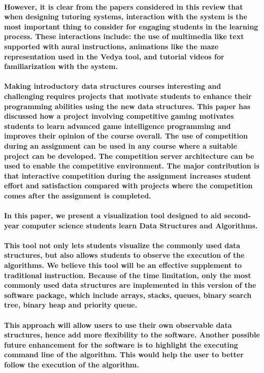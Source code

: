 \documentclass{article}
\begin{document}
\paragraph{\cite{de2006can}However, it is clear from the papers considered in this review that when designing tutoring systems, interaction with the system is the most important thing to consider for engaging students in the learning process. These interactions include: the use of multimedia like text supported with aural instructions, animations like the maze representation used in the Vedya tool, and tutorial videos for familiarization with the system.}

\paragraph{Making introductory data structures courses interesting and challenging requires projects that motivate students to enhance their programming abilities using the new data structures. This paper has discussed how a project involving competitive gaming motivates students to learn advanced game intelligence programming and improves their opinion of the course overall. The use of competition during an assignment can be used in any course where a suitable project can be developed. The competition server architecture can be used to enable the competitive environment. The major contribution is that interactive competition during the assignment increases student effort and satisfaction compared with projects where the competition comes after the assignment is completed.}
\paragraph{In this paper, we present a visualization tool designed to aid second-year computer science students learn Data Structures and Algorithms.}
\paragraph{This tool not only lets students visualize the commonly used data structures, but also allows students to  observe the execution of the algorithms. We believe this tool will be an effective supplement to traditional instruction. Because of the time limitation, only the most commonly used data structures are implemented in this version of the software package, which include arrays, stacks, queues, binary search tree, binary heap and priority queue.} 
\paragraph{\cite{kreutz2015software}This approach will allow users to use their own observable data structures, hence add more flexibility to the software. Another possible future enhancement for the software is to highlight the executing command line of the algorithm. This would help the user to better follow the execution of the algorithm.}
 

\newpage


\end{document}
